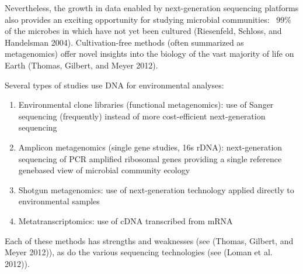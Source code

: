 \documentclass[letterpaper,10pt,english]{sphinxmanual}
\begin{document}
Nevertheless, the growth in data enabled by next-generation sequencing
platforms also provides an exciting opportunity for studying microbial
communities:  99\% of the microbes in which have not yet been cultured
(Riesenfeld, Schloss, and Handelsman 2004). Cultivation-free methods
(often summarized as metagenomics) offer novel insights into the biology
of the vast majority of life on Earth (Thomas, Gilbert, and Meyer 2012).

Several types of studies use DNA for environmental analyses:
\begin{enumerate}
\def\theenumi{\arabic{enumi}}
\def\labelenumi{\theenumi .}
\makeatletter\def\p@enumii{\p@enumi \theenumi .}\makeatother
\item {} 
Environmental clone libraries (functional metagenomics): use of
Sanger sequencing (frequently) instead of more cost-efficient
next-generation sequencing

\item {} 
Amplicon metagenomics (single gene studies, 16s rDNA):
next-generation sequencing of PCR amplified ribosomal genes providing
a single reference gene\textendash{}based view of microbial community ecology

\item {} 
Shotgun metagenomics: use of next-generation technology applied
directly to environmental samples

\item {} 
Metatranscriptomics: use of cDNA transcribed from mRNA

\end{enumerate}

Each of these methods has strengths and weaknesses (see (Thomas,
Gilbert, and Meyer 2012)), as do the various sequencing technologies
(see (Loman et al. 2012)).
\end{document}
